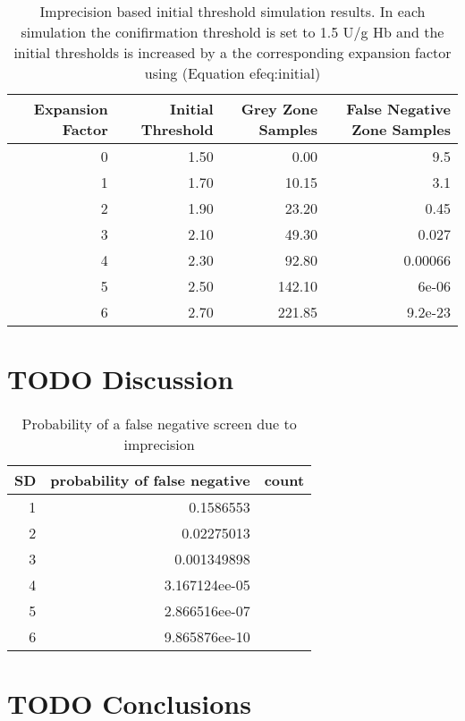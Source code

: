 \documentclass[review]{elsarticle}
\begin{document}
\begin{table}[ht]
\centering
\begin{tabular}{rrrr}
  \hline
Expansion Factor & Initial Threshold & Grey Zone Samples & False Negative Zone Samples \\ 
  \hline
  0 & 1.50 & 0.00 & 9.5 \\ 
    1 & 1.70 & 10.15 & 3.1 \\ 
    2 & 1.90 & 23.20 & 0.45 \\ 
    3 & 2.10 & 49.30 & 0.027 \\ 
    4 & 2.30 & 92.80 & 0.00066 \\ 
    5 & 2.50 & 142.10 & 6e-06 \\ 
    6 & 2.70 & 221.85 & 9.2e-23 \\ 
   \hline
\end{tabular}
\caption{Imprecision based initial threshold simulation results. In each simulation the conifirmation threshold is set to 1.5 U/g Hb and the initial thresholds is increased by a the corresponding expansion factor using (Equation 
ef{eq:initial}) } 
\label{tab:imprecision}
\end{table}

\clearpage

\section*{{\bfseries\sffamily TODO} Discussion}
\label{sec:org38c1bb3}

\begin{table}[htbp]
\caption[sigma]{\label{tab:org80c9190}Probability of a false negative screen due to imprecision}
\centering
\begin{tabular}{rrl}
SD & probability of false negative & count\\
\hline
1 & 0.1586553\\
2 & 0.02275013\\
3 & 0.001349898\\
4 & 3.167124ee-05\\
5 & 2.866516ee-07\\
6 & 9.865876ee-10\\
\end{tabular}
\end{table}

\section*{{\bfseries\sffamily TODO} Conclusions}
\label{sec:orgf9e2397}
\end{document}
